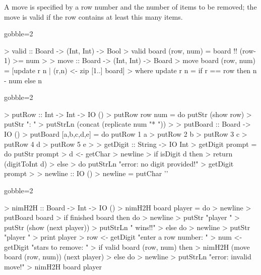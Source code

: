 \begin{impl}
A move is specified by a row number and the number of items to be removed; the move is valid if the row contains at least this many items.
\end{impl}
\begin{haskellcode*}{gobble=2}

> valid :: Board -> (Int, Int) -> Bool
> valid board (row, num) = board !! (row-1) >= num
> 
> move :: Board -> (Int, Int) -> Board
> move board (row, num) = [update r n | (r,n) <- zip [1..] board]
>      where update r n = if r == row then n - num else n

\end{haskellcode*}

\begin{impl}
\end{impl}
\begin{haskellcode*}{gobble=2}

> putRow :: Int -> Int -> IO ()
> putRow row num = do putStr (show row)
>                     putStr ": "
>                     putStrLn (concat (replicate num "* "))
> 
> putBoard :: Board -> IO ()
> putBoard [a,b,c,d,e] = do putRow 1 a
>                           putRow 2 b
>                           putRow 3 c
>                           putRow 4 d
>                           putRow 5 e
> 
> getDigit :: String -> IO Int
> getDigit prompt = do putStr prompt
>                      d <- getChar
>                      newline
>                      if isDigit d then
>                         return (digitToInt d)
>                      else 
>                         do putStrLn "error: no digit provided!"
>                            getDigit prompt
> 
> newline :: IO ()
> newline = putChar '\n'

\end{haskellcode*}

\begin{impl}
\end{impl}
\begin{haskellcode*}{gobble=2}

> nimH2H :: Board -> Int -> IO ()
> nimH2H board player = do
>     newline
>     putBoard board
>     if finished board then do 
>         newline
>         putStr "player "
>         putStr (show (next player))
>         putStrLn " wins!!"
>     else do
>         newline
>         putStr "player "
>         print player
>         row <- getDigit "enter a row number: "
>         num <- getDigit "stars to remove: "
>         if valid board (row, num) then
>             nimH2H (move board (row, num)) (next player)
>         else do
>             newline
>             putStrLn "error: invalid move!"
>             nimH2H board player

\end{haskellcode*}

